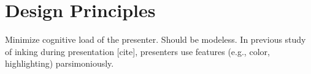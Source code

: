 \section{Design Principles}

Minimize cognitive load of the presenter. Should be modeless.
In previous study of inking during presentation [cite], presenters use
features (e.g., color, highlighting) parsimoniously.


